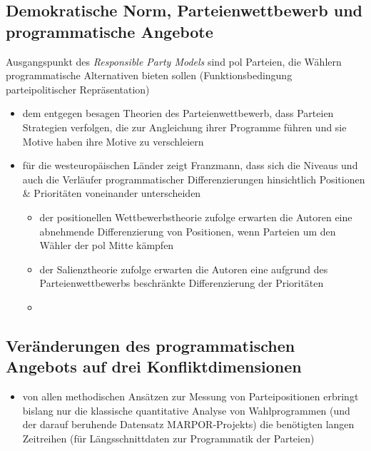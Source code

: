 \documentclass[11pt]{article}
\begin{document}
\subsection{Demokratische Norm, Parteienwettbewerb und programmatische Angebote}
\label{sec:orgfaba651}
Ausgangspunkt des \emph{Responsible Party Models} sind pol Parteien, die Wählern programmatische Alternativen bieten sollen (Funktionsbedingung parteipolitischer Repräsentation)
\begin{itemize}
\item dem entgegen besagen Theorien des Parteienwettbewerb, dass Parteien Strategien verfolgen, die zur Angleichung ihrer Programme führen und sie Motive haben ihre Motive zu verschleiern
\item für die westeuropäischen Länder zeigt Franzmann, dass sich die Niveaus und auch die Verläufer programmatischer Differenzierungen hinsichtlich Positionen \& Prioritäten voneinander unterscheiden
\begin{itemize}
\item der positionellen Wettbewerbstheorie zufolge erwarten die Autoren eine abnehmende Differenzierung von Positionen, wenn Parteien um den Wähler der pol Mitte kämpfen
\item der Salienztheorie zufolge erwarten die Autoren eine aufgrund des Parteienwettbewerbs beschränkte Differenzierung der Prioritäten
\item 
\end{itemize}
\end{itemize}

\subsection{Veränderungen des programmatischen Angebots auf drei Konfliktdimensionen}
\label{sec:orgb5e2200}
\begin{itemize}
\item von allen methodischen Ansätzen zur Messung von Parteipositionen erbringt bislang nur die klassische quantitative Analyse von Wahlprogrammen (und der darauf beruhende Datensatz MARPOR-Projekts) die benötigten langen Zeitreihen (für Längsschnittdaten zur Programmatik der Parteien)
\end{itemize}
\end{document}

